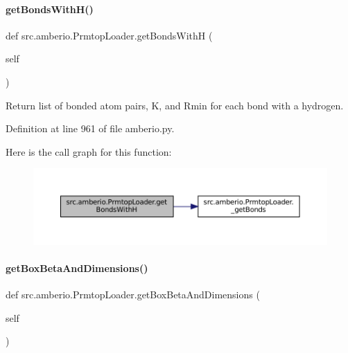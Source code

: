 \paragraph{\texorpdfstring{get\+Bonds\+With\+H()}{getBondsWithH()}}
{\footnotesize\ttfamily def src.\+amberio.\+Prmtop\+Loader.\+get\+Bonds\+WithH (\begin{DoxyParamCaption}\item[{}]{self }\end{DoxyParamCaption})}



Return list of bonded atom pairs, K, and Rmin for each bond with a hydrogen. 



Definition at line 961 of file amberio.\+py.

Here is the call graph for this function\+:
\nopagebreak
\begin{figure}[H]
\begin{center}
\leavevmode
\includegraphics[width=350pt]{classsrc_1_1amberio_1_1PrmtopLoader_ab75f7fa3f828685a1959e8c0f270f3ec_cgraph}
\end{center}
\end{figure}
\mbox{\label{classsrc_1_1amberio_1_1PrmtopLoader_ae2075caa02525b6e4b2cded2ed7e7a3d}} 
\paragraph{\texorpdfstring{get\+Box\+Beta\+And\+Dimensions()}{getBoxBetaAndDimensions()}}
{\footnotesize\ttfamily def src.\+amberio.\+Prmtop\+Loader.\+get\+Box\+Beta\+And\+Dimensions (\begin{DoxyParamCaption}\item[{}]{self }\end{DoxyParamCaption})}




